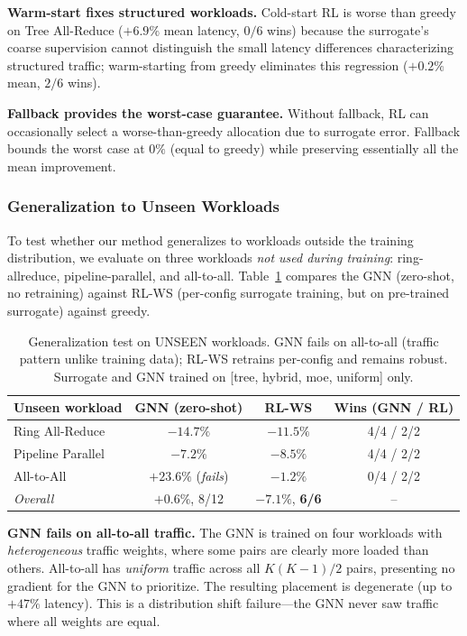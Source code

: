 \noindent\textbf{Warm-start fixes structured workloads.} Cold-start RL is
worse than greedy on Tree All-Reduce ($+6.9\%$ mean latency, $0/6$ wins) because
the surrogate's coarse supervision cannot distinguish the small latency
differences characterizing structured traffic; warm-starting from greedy
eliminates this regression ($+0.2\%$ mean, $2/6$ wins).

\noindent\textbf{Fallback provides the worst-case guarantee.} Without fallback,
RL can occasionally select a worse-than-greedy allocation due to surrogate
error. Fallback bounds the worst case at $0\%$ (equal to greedy) while
preserving essentially all the mean improvement.

\subsubsection{Generalization to Unseen Workloads}

To test whether our method generalizes to workloads outside the training
distribution, we evaluate on three workloads \emph{not used during training}:
ring-allreduce, pipeline-parallel, and all-to-all. Table~\ref{tab:generalization}
compares the GNN (zero-shot, no retraining) against RL-WS (per-config surrogate
training, but on pre-trained surrogate) against greedy.

\begin{table}[t]
\centering
\caption{Generalization test on UNSEEN workloads. GNN fails on all-to-all
(traffic pattern unlike training data); RL-WS retrains per-config and remains
robust. Surrogate and GNN trained on [tree, hybrid, moe, uniform] only.}
\label{tab:generalization}
\small
\begin{tabular}{lccc}
\toprule
Unseen workload   & GNN (zero-shot) & \textbf{RL-WS} & Wins (GNN / RL) \\
\midrule
Ring All-Reduce   & $\mathbf{-14.7\%}$ & $-11.5\%$ & 4/4 / 2/2 \\
Pipeline Parallel & $-7.2\%$ & $\mathbf{-8.5\%}$ & 4/4 / 2/2 \\
All-to-All        & $+23.6\%$ (\emph{fails}) & $\mathbf{-1.2\%}$ & 0/4 / 2/2 \\
\midrule
\emph{Overall}    & $+0.6\%$, 8/12 & $\mathbf{-7.1\%}$, \textbf{6/6} & -- \\
\bottomrule
\end{tabular}
\end{table}

\noindent\textbf{GNN fails on all-to-all traffic.} The GNN is trained on four
workloads with \emph{heterogeneous} traffic weights, where some pairs are
clearly more loaded than others. All-to-all has \emph{uniform} traffic across
all $K(K-1)/2$ pairs, presenting no gradient for the GNN to prioritize. The
resulting placement is degenerate (up to $+47\%$ latency). This is a
distribution shift failure---the GNN never saw traffic where all weights are
equal.

